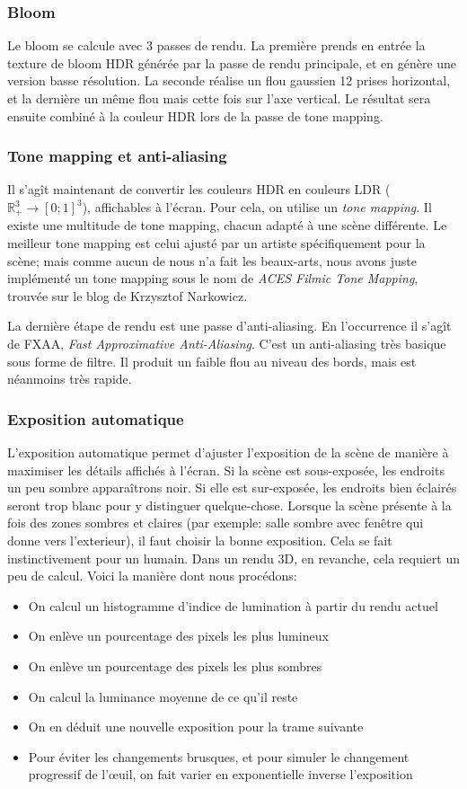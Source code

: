 \documentclass[a4paper,12pt]{article}
\begin{document}
\subsubsection{Bloom}
Le bloom se calcule avec 3 passes de rendu. La première prends en entrée la texture de bloom HDR générée par la passe de rendu principale,
et en génère une version basse résolution. La seconde réalise un flou gaussien 12 prises horizontal, et la dernière un même flou mais cette
fois sur l'axe vertical. Le résultat sera ensuite combiné à la couleur HDR lors de la passe de tone mapping.

\subsubsection{Tone mapping et anti-aliasing}
Il s'agît maintenant de convertir les couleurs HDR en couleurs LDR ($\mathbb{R}_+^3 \to [0; 1]^3$), affichables à l'écran.
Pour cela, on utilise un \emph{tone mapping}. Il existe une multitude de tone mapping, chacun adapté à une scène différente.
Le meilleur tone mapping est celui ajusté par un artiste spécifiquement pour la scène; mais comme aucun de nous n'a fait les
beaux-arts, nous avons juste implémenté un tone mapping sous le nom de \emph{ACES Filmic Tone Mapping}, trouvée sur le blog de
Krzysztof Narkowicz.

La dernière étape de rendu est une passe d'anti-aliasing. En l'occurrence il s'agît de FXAA, \emph{Fast Approximative Anti-Aliasing}.
C'est un anti-aliasing très basique sous forme de filtre. Il produit un faible flou au niveau des bords, mais est néanmoins très rapide.

\subsubsection{Exposition automatique}
L'exposition automatique permet d'ajuster l'exposition de la scène de manière à maximiser les détails affichés à l'écran. Si la scène
est sous-exposée, les endroits un peu sombre apparaîtrons noir. Si elle est sur-exposée, les endroits bien éclairés seront trop blanc
pour y distinguer quelque-chose. Lorsque la scène présente à la fois des zones sombres et claires (par exemple: salle sombre avec fenêtre
qui donne vers l'exterieur), il faut choisir la bonne exposition. Cela se fait instinctivement pour un humain. Dans un rendu 3D, en revanche,
cela requiert un peu de calcul. Voici la manière dont nous procédons:
\begin{itemize}
    \item On calcul un histogramme d'indice de lumination à partir du rendu actuel
    \item On enlève un pourcentage des pixels les plus lumineux
    \item On enlève un pourcentage des pixels les plus sombres
    \item On calcul la luminance moyenne de ce qu'il reste
    \item On en déduit une nouvelle exposition pour la trame suivante
    \item Pour éviter les changements brusques, et pour simuler le changement progressif de l'œuil, on fait varier en exponentielle inverse l'exposition
\end{itemize}
\end{document}
